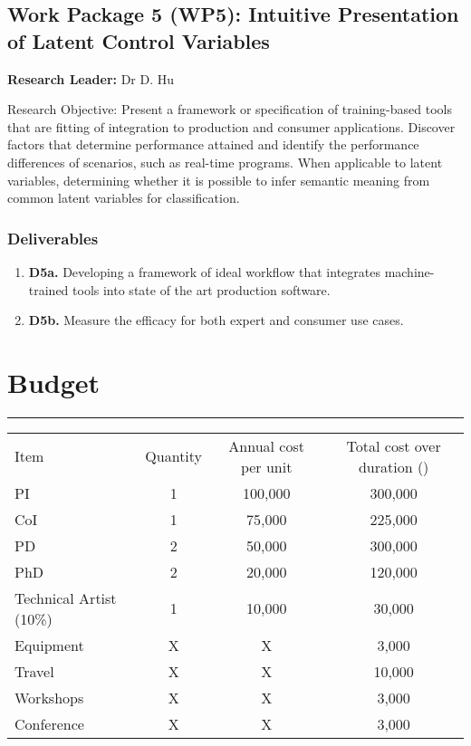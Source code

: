 \documentclass[a4paper, fontsize=15pt, onecolumn]{article} %
\numberwithin{equation}{section} %
\numberwithin{figure}{section} %
\numberwithin{table}{section} %
\begin{document}
\subsection{Work Package 5 (WP5): Intuitive Presentation of Latent Control Variables}
\textbf{Research Leader:} Dr D. Hu\par
Research Objective: Present a framework or specification of training-based tools that are fitting of integration to production and consumer applications. Discover factors that determine performance attained and identify the performance differences of scenarios, such as real-time programs.
 When applicable to latent variables, determining whether it is possible to infer semantic meaning from common latent variables for classification.

\subsubsection{Deliverables}
\begin{enumerate}
\item \textbf{D5a.} Developing a framework of ideal workflow that integrates machine-trained tools into state of the art production software.
\item \textbf{D5b.} Measure the efficacy for both expert and consumer use cases.
\end{enumerate}
	


\newpage

\section*{Budget}
\hrule

\begin{table}[!h]
	\centering
	\begin{tabular}{|l|c|c|c|}
		\hline
		Item		& Quantity	& Annual cost per unit	& Total cost over duration (\textsterling)\\
		PI			& 1			& 100,000				& 300,000\\
		\hline
		CoI			& 1			& 75,000				& 225,000\\
		\hline
		PD			& 2			& 50,000				& 300,000\\
		\hline
		PhD			& 2			& 20,000				& 120,000\\
		\hline
		Technical Artist (10\%) & 1 & 10,000			& 30,000\\
		\hline
		Equipment	& X			& X						& 3,000\\		
		\hline
		Travel		& X			& X						& 10,000\\		
		\hline
		Workshops	& X			& X						& 3,000\\		
		\hline
		Conference	& X			& X						& 3,000\\		
		\hline
	\end{tabular}
\end{table}
\end{document}
